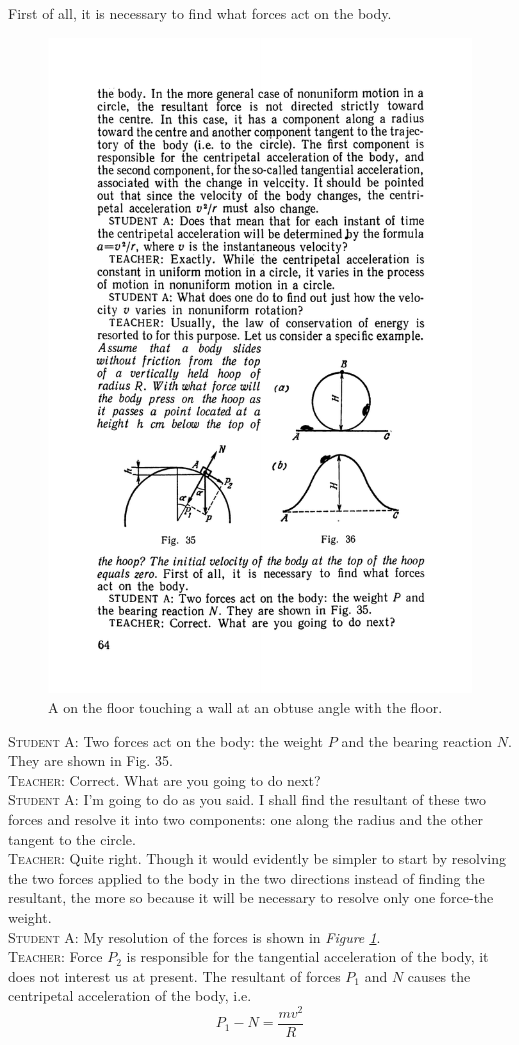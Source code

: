 \documentclass[a4paper,sfsidenotes]{tufte-book}
\begin{document}
First of all, it is necessary to find what forces act on the body.
\\
\begin{figure}
\centering
\includegraphics[width=0.6\linewidth]{fig-035a.pdf}
\caption{A on the floor touching a wall at an obtuse angle with the floor.}
\label{fig-35}
\end{figure}
\textsc{Student A:} Two forces act on the body: the weight $P$ and
the bearing reaction $N$. They are shown in Fig. 35.
\\
\textsc{Teacher:} Correct. What are you going to do next?
\\
\textsc{Student A:} I'm going to do as you said. I shall find the resultant of these two forces and resolve it into two components: one along the radius and the other tangent to the circle.
\\
\textsc{Teacher:} Quite right. Though it would evidently be simpler to start by resolving the two forces applied to the body in the two directions instead of finding the resultant, the more so because it will be necessary to resolve only one force-the weight.
\\
\textsc{Student A:} My resolution of the forces is shown in \emph{Figure \ref{fig-35}}.
\\
\textsc{Teacher:} Force $P_{2}$ is responsible for the tangential acceleration of the body, it does not interest us at present. The resultant of forces $P_{1}$ and $N$ causes the centripetal acceleration of the body, i.e.
\begin{equation}
P_{1} - N = \frac{mv^{2}}{R}
\label{eq-35}
\end{equation}
\end{document}
